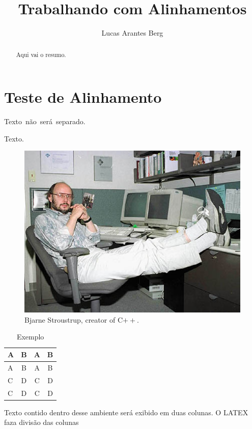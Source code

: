\documentclass[]{article}
\title{Trabalhando com Alinhamentos}
\author{Lucas Arantes Berg}
\begin{document}
\maketitle

\begin{abstract}
	Aqui vai o resumo.
\end{abstract}

\section{Teste de Alinhamento}

\mbox{Texto não será separado.}


\begin{minipage}{\linewidth}
	\centering
	\begin{minipage}{0.45\linewidth}
		Texto.
	\end{minipage}
	\hspace{0.05\linewidth}
	\begin{minipage}{0.45\linewidth}
		\begin{figure}[H]
			\includegraphics[width=\linewidth]{img/BjarneStroustrup.jpg}
			\caption{Bjarne Stroustrup, creator of C$++$.}
		\end{figure}
	\end{minipage}
\end{minipage}

\newpage
\begin{landscape}
	\begin{table}
		\caption{Exemplo}
		\centering
		\begin{tabular}{lccc}
			\hline
			A & B & A & B \\
			\hline
			A & B & A & B \\
			C & D & C & D \\
			C & D & C & D \\
			\hline
		\end{tabular}
	\end{table}
\end{landscape}

\begin{multicols}{3}
	Texto contido dentro desse ambiente será exibido em duas colunas. O LATEX faza divisão das colunas
\end{multicols}
\end{document}
